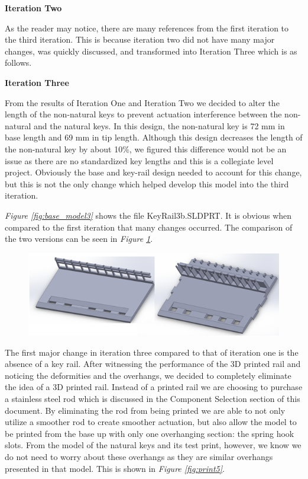\textbf{Iteration Two}

As the reader may notice, there are many references from the first iteration to the third iteration. This is because iteration two did not have many major changes, was quickly discussed, and transformed into Iteration Three which is as follows.

\textbf{Iteration Three}

From the results of Iteration One and Iteration Two we decided to alter the length of the non-natural keys to prevent actuation interference between the non-natural and the natural keys. In this design, the non-natural key is 72 mm in base length and 69 mm in tip length. Although this design decreases the length of the non-natural key by about 10\%, we figured this difference would not be an issue as there are no standardized key lengths and this is a collegiate level project. Obviously the base and key-rail design needed to account for this change, but this is not the only change which helped develop this model into the third iteration.

\textit{Figure \ref{fig:base_model3}} shows the file KeyRail3b.SLDPRT. It is obvious when compared to the first iteration that many changes occurred. The comparison of the two versions can be seen in \textit{Figure \ref{fig:base_model2}}.

\begin{figure}[h!]
  \centering
  \includegraphics[width=0.8\linewidth]{image/BaseModel2.png}
  \caption{}
  \label{fig:base_model2}
\end{figure}

The first major change in iteration three compared to that of iteration one is the absence of a key rail. After witnessing the performance of the 3D printed rail and noticing the deformities and the overhangs, we decided to completely eliminate the idea of a 3D printed rail. Instead of a printed rail we are choosing to purchase a stainless steel rod which is discussed in the Component Selection section of this document. By eliminating the rod from being printed we are able to not only utilize a smoother rod to create smoother actuation, but also allow the model to be printed from the base up with only one overhanging section: the spring hook slots. From the model of the natural keys and its test print, however, we know we do not need to worry about these overhangs as they are similar overhangs presented in that model. This is shown in \textit{Figure \ref{fig:print5}}.

